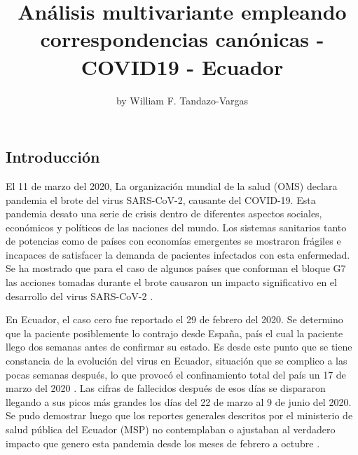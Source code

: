 \title{Análisis multivariante empleando correspondencias canónicas -
COVID19 - Ecuador}
\author{by William F. Tandazo-Vargas}

\maketitle


\hypertarget{introducciuxf3n}{%
\subsection{Introducción}\label{introducciuxf3n}}

El 11 de marzo del 2020, La organización mundial de la salud (OMS)
declara pandemia el brote del virus SARS-CoV-2, causante del COVID-19.
Esta pandemia desato una serie de crisis dentro de diferentes aspectos
sociales, económicos y políticos de las naciones del mundo. Los sistemas
sanitarios tanto de potencias como de países con economías emergentes se
mostraron frágiles e incapaces de satisfacer la demanda de pacientes
infectados con esta enfermedad. Se ha mostrado que para el caso de
algunos países que conforman el bloque G7 las acciones tomadas durante
el brote causaron un impacto significativo en el desarrollo del virus
SARS-CoV-2 \citep{ZHANG2020109829}.

En Ecuador, el caso cero fue reportado el 29 de febrero del 2020. Se
determino que la paciente posiblemente lo contrajo desde España, país el
cual la paciente llego dos semanas antes de confirmar su estado. Es
desde este punto que se tiene constancia de la evolución del virus en
Ecuador, situación que se complico a las pocas semanas después, lo que
provocó el confinamiento total del país un 17 de marzo del 2020
\citep{Haro2020}. Las cifras de fallecidos después de esos días se
dispararon llegando a sus picos más grandes los días del 22 de marzo al
9 de junio del 2020. Se pudo demostrar luego que los reportes generales
descritos por el ministerio de salud pública del Ecuador (MSP) no
contemplaban o ajustaban al verdadero impacto que genero esta pandemia
desde los meses de febrero a octubre \citep{CEVALLOSVALDIVIEZO2021297}.

